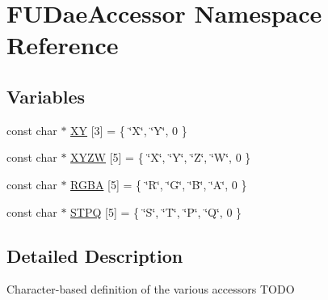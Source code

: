 \hypertarget{namespaceFUDaeAccessor}{
\section{FUDaeAccessor Namespace Reference}
\label{namespaceFUDaeAccessor}
}
\subsection*{Variables}
\begin{DoxyCompactItemize}
\item 
const char $\ast$ \hyperlink{namespaceFUDaeAccessor_a0918cc7895d223e683eeb6faaa6ccaf4}{XY} \mbox{[}3\mbox{]} = \{ \char`\"{}X\char`\"{}, \char`\"{}Y\char`\"{}, 0 \}
\item 
const char $\ast$ \hyperlink{namespaceFUDaeAccessor_a5a5bd329a6d739c21ce31f2c44f020ae}{XYZW} \mbox{[}5\mbox{]} = \{ \char`\"{}X\char`\"{}, \char`\"{}Y\char`\"{}, \char`\"{}Z\char`\"{}, \char`\"{}W\char`\"{}, 0 \}
\item 
const char $\ast$ \hyperlink{namespaceFUDaeAccessor_a221226d2b1f56ac784b7801fa60cbe9c}{RGBA} \mbox{[}5\mbox{]} = \{ \char`\"{}R\char`\"{}, \char`\"{}G\char`\"{}, \char`\"{}B\char`\"{}, \char`\"{}A\char`\"{}, 0 \}
\item 
const char $\ast$ \hyperlink{namespaceFUDaeAccessor_a3951a6fad0eefe570cc5b450891c449f}{STPQ} \mbox{[}5\mbox{]} = \{ \char`\"{}S\char`\"{}, \char`\"{}T\char`\"{}, \char`\"{}P\char`\"{}, \char`\"{}Q\char`\"{}, 0 \}
\end{DoxyCompactItemize}


\subsection{Detailed Description}
Character-\/based definition of the various accessors TODO 


